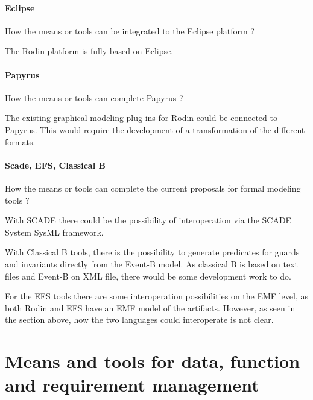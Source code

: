 \paragraph{Eclipse}
How the means or tools can be integrated to the Eclipse platform ?

\begin{author_comment}
  The Rodin platform is fully based on Eclipse.
\end{author_comment}

\paragraph{Papyrus}
How the means or tools can complete  Papyrus ?

\begin{author_comment}
  The existing graphical modeling plug-ins for Rodin could be connected to
  Papyrus. This would require the development of a transformation of the
  different formats.
\end{author_comment}


\paragraph{Scade, EFS, Classical B}
How the means or tools can complete the current proposals for formal modeling tools ?

\begin{author_comment}
  With SCADE there could be the possibility of interoperation via the SCADE
  System SysML framework.

  With Classical B tools, there is the possibility to generate predicates for
  guards and invariants directly from the Event-B model. As classical B is based
  on text files and Event-B on XML file, there would be some development work to
  do.

  For the EFS tools there are some interoperation possibilities on the EMF
  level, as both Rodin and EFS have an EMF model of the artifacts. However, as
  seen in the section above, how the two languages could interoperate is not
  clear.
\end{author_comment}


\section{Means and tools for data, function and requirement management}
\label{sec:management}


